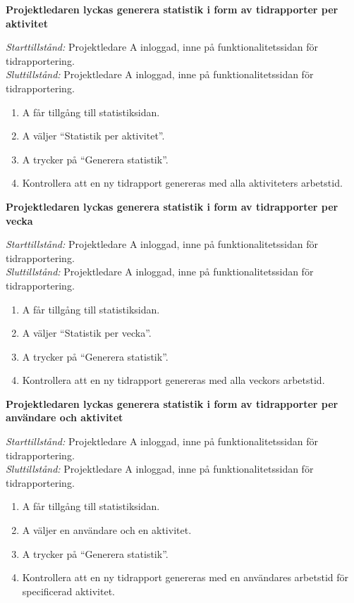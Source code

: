 \documentclass[a4paper]{article}
\begin{document}
\begin{FT}
\item
\textbf{Projektledaren lyckas generera statistik i form av tidrapporter per aktivitet}

\emph{Starttillstånd:} Projektledare A inloggad, inne på funktionalitetssidan för tidrapportering.\\
\emph{Sluttillstånd:} Projektledare A inloggad, inne på funktionalitetssidan för tidrapportering.

\begin{enumerate}
\item A får tillgång till statistiksidan.
\item A väljer ``Statistik per aktivitet''.
\item A trycker på ``Generera statistik''.
\item Kontrollera att en ny tidrapport genereras med alla aktiviteters arbetstid.
\end{enumerate}


\item
\textbf{Projektledaren lyckas generera statistik i form av tidrapporter per vecka}

\emph{Starttillstånd:} Projektledare A inloggad, inne på funktionalitetssidan för tidrapportering.\\
\emph{Sluttillstånd:} Projektledare A inloggad, inne på funktionalitetssidan för tidrapportering.

\begin{enumerate}
\item A får tillgång till statistiksidan.
\item A väljer ``Statistik per vecka''.
\item A trycker på ``Generera statistik''.
\item Kontrollera att en ny tidrapport genereras med alla veckors arbetstid.
\end{enumerate}


\item
\textbf{Projektledaren lyckas generera statistik i form av tidrapporter per användare och aktivitet}

\emph{Starttillstånd:} Projektledare A inloggad, inne på funktionalitetssidan för tidrapportering.\\
\emph{Sluttillstånd:} Projektledare A inloggad, inne på funktionalitetssidan för tidrapportering.

\begin{enumerate}
\item A får tillgång till statistiksidan.
\item A väljer en användare och en aktivitet.
\item A trycker på ``Generera statistik''.
\item Kontrollera att en ny tidrapport genereras med en användares arbetstid för specificerad aktivitet.
\end{enumerate}



\end{FT}
\end{document}
